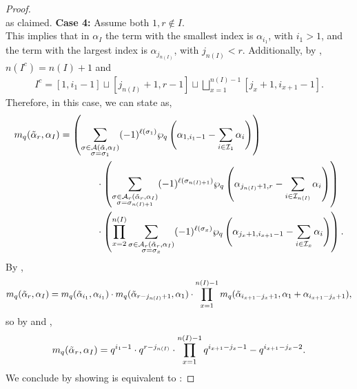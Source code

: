 \documentclass[10pt]{article}
\newcommand{\hr}[0]{\Tilde{\alpha}}
\newcommand{\newmu}[0]{\alpha_I}
\newcommand{\thealtset}[0]{\mathcal{A}(\hr,\newmu)}
\newcommand{\qpartition}[1]{\wp_q\left(#1\right)}
\begin{document}
\begin{proof}
\begin{equation}
    \end{equation}
    as claimed.
    \newline\noindent \textbf{Case 4:} Assume both $1,r\notin I$. \\
    This implies that in $\alpha_I$ the term with the smallest index is $\alpha_{i_1}$, with $i_1>1$, and the term with the largest index is $\alpha_{j_{n(I)}}$, with $j_{n(I)}<r$. Additionally, by , $n(I^c)=n(I)+1$ and 
    \begin{align}
        I^c = [1,i_1-1] \sqcup [j_{n(I)}+1,r-1] \sqcup \bigsqcup_{x=1}^{n(I)-1}[j_x+1,i_{x+1}-1].\label{interval partition for case 4}
    \end{align}
    Therefore, in this case, we can state  as,
    \begin{align}
        &m_q(\hr_r,\alpha_I)=\left(\sum_{\substack{\sigma\in\thealtset\\\sigma=\sigma_1}}(-1)^{\ell(\sigma_1)}\qpartition{\alpha_{1,i_1-1}-\sum_{i\in\mathcal{I}_1}\alpha_i}\right)\notag\\
        &\hspace{3cm}\cdot\left(\sum_{\substack{\sigma\in\mathcal{A}_{r}(\hr_r,\alpha_I) \\ \sigma = \sigma_{n(I)+1}}}(-1)^{\ell(\sigma_{n(I)+1})}\qpartition{\alpha_{j_{n(I)}+1,r}-\sum_{i\in\mathcal{I}_{n(I)}}\alpha_i}\right)\notag \\
        &\hspace{3cm}\cdot \left(\prod_{x=2}^{n(I)}\sum_{\substack{\sigma\in\mathcal{A}_r(\hr_r,\alpha_I)\\ \sigma = \sigma_x}}(-1)^{\ell(\sigma_x)}\qpartition{\alpha_{j_x+1,i_{x+1}-1}-\sum_{i\in\mathcal{I}_x}\alpha_i}\right).\label{case 4 starting point}
    \end{align}
    By ,
    \begin{align}
        m_q(\hr_r,\alpha_I)=m_q(\hr_{i_1},\alpha_{i_1})\cdot m_q(\hr_{r-j_{n(I)}+1},\alpha_1)\cdot  \prod_{x=1}^{n(I)-1}m_q(\hr_{i_{x+1}-j_x+1},\alpha_1+\alpha_{i_{x+1}-j_x+1}),
    \end{align}
    so by  and , 
    \begin{equation}
        m_q(\hr_r,\alpha_I) = q^{i_1-1}\cdot q^{r-j_{n(I)}}\cdot \prod_{x=1}^{n(I)-1}q^{i_{x+1}-j_x-1}-q^{i_{x+1}-j_x-2}.\label{case 4 wrap it up}
    \end{equation}
    We conclude by showing  is equivalent to :

\end{proof}
\end{document}
